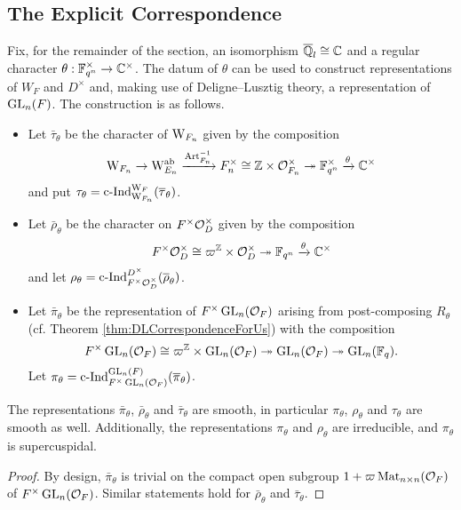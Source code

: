\documentclass[../main.tex]{subfiles}
\begin{document}
\subsection{The Explicit Correspondence} %
\label{sub:The Explicit Correspondence}
Fix, for the remainder of the section, an isomorphism $\overline {\mathbb{Q}}_l \cong \mathbb{C}$ and
a regular character $\theta: \mathbb{F}_{q^n}^\times \to \mathbb{C}^\times$. 
The datum of $\theta$ can be used to construct representations 
of $W_F$ and $D^\times$ and, making use of Deligne--Lusztig
theory, a representation of $\operatorname{GL}_n(F)$. The construction is as follows.
\begin{itemize}
  \item Let $\bar \tau_\theta$ be the character of $\mathrm W_{F_n}$ given by 
    the composition
    \begin{equation*}
      \mathrm W_{F_n} \to \mathrm W_{E_n}^{\mathrm{ab}} \xrightarrow{\mathrm{Art}_{F_n}^{-1}} F_n^\times \cong
      \mathbb{Z} \times \mathcal{O}_{F_n}^\times \twoheadrightarrow \mathbb{F}_{q^n}^\times \xrightarrow{\theta} \mathbb{C}^\times
    \end{equation*}
  and put $\tau_\theta = \mathrm{c\text{-}Ind}_{\mathrm W_{F_n}}^{\mathrm W_F}(\overline \tau_\theta)$.
  \item Let $\bar \rho_\theta$ be the character on 
    $F^\times \mathcal{O}_D^\times$ given by the composition
    \begin{equation*}
      F^\times\mathcal{O}_D^\times \cong \varpi^{\mathbb{Z}} \times \mathcal{O}_D^\times \twoheadrightarrow 
      \mathbb{F}_{q^n} \xrightarrow{\theta} \mathbb{C}^\times
    \end{equation*}
    and let $\rho_\theta = \mathrm{c\text{-}Ind}_{F^\times \mathcal{O}_D^\times}^{D^\times}(\overline \rho_\theta)$.
  \item Let $\bar \pi_\theta$ be the representation of $F^\times \operatorname{GL}_n(\mathcal{O}_F)$
    arising from post-composing $R_\theta$ (cf. Theorem
    \ref{thm:DLCorrespondenceForUs}) with the composition
    \begin{equation*}
      F^\times \operatorname{GL}_n(\mathcal{O}_F) \cong \varpi^{\mathbb{Z}} \times \operatorname{GL}_n(\mathcal{O}_F)
      \twoheadrightarrow \operatorname{GL}_n(\mathcal{O}_F) \twoheadrightarrow \operatorname{GL}_n(\mathbb{F}_q).
    \end{equation*}
    Let $\pi_\theta = \mathrm{c\text{-}Ind}_{F^\times \operatorname{GL}_n(\mathcal{O}_F)}^{\operatorname{GL}_n(F)}(\overline \pi_\theta)$. 
\end{itemize}

\begin{lem}\label{lem:BarRepsAreSmooth}
  The representations $\bar \pi_\theta$, $\bar \rho_\theta$ and $\bar
  \tau_\theta$ are smooth, in particular
  $\pi_\theta$, $\rho_\theta$ and $\tau_\theta$ are smooth as well. Additionally, the
  representations $\pi_\theta$ and $\rho_\theta$ are irreducible, and
  $\pi_\theta$ is supercuspidal.
\begin{proof}
  By design, $\bar \pi_\theta$ is trivial on the compact open subgroup $1 +
  \varpi \operatorname{Mat}_{n \times n}(\mathcal{O}_F)$ of $F^\times \operatorname{GL}_n(\mathcal{O}_F)$. Similar
  statements hold for $\bar \rho_\theta$
  and $\bar \tau_\theta$. 
\end{proof}
\end{lem}
\end{document}
